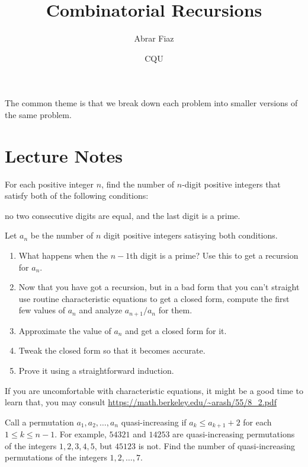 \documentclass[11pt]{article}
\title{Combinatorial Recursions}
\author{Abrar Fiaz}
\date{CQU}
\begin{document}
\maketitle

The common theme is that we break down each problem into smaller versions of the same problem.





\section{Lecture Notes}


\begin{exam}[USAJMO 2018/1]
For each positive integer $n$, find the number of $n$-digit positive integers that satisfy both of the following conditions:
\begin{itemize}
\Item no two consecutive digits are equal, and
\Item the last digit is a prime.
\end{itemize}
\end{exam}

\begin{walk}
Let $a_n$ be the number of $n$ digit positive integers satisying both conditions.

\begin{enumerate}
\item What happens when the $n-1$th digit is a prime? Use this to get a recursion for $a_n.$
\item Now that you have got a recursion, but in a bad form that you can't straight use routine characteristic equations to get a closed form, compute the first few 
values of $a_n$ and analyze $a_{n+1}/a_n$ for them.
\item Approximate the value of $a_n$ and get a closed form for it.
\item Tweak the closed form so that it becomes accurate.
\item Prove it using a straightforward induction. 
\end{enumerate}
\end{walk}

If you are uncomfortable with characteristic equations, it might be a good time to learn that, you may consult  \href{}{\url{https://math.berkeley.edu/~arash/55/8_2.pdf}}


\begin{exam}[AIME 2015 II/10]
Call a permutation $a_1,a_2,\ldots,a_n$ quasi-increasing if $a_k\le a_{k+1}+2$ for each $1\le k\le n-1$. For example, $54321$ and $14253$ are quasi-increasing permutations of the integers $1,2,3,4,5$, but $45123$ is not. Find the number of quasi-increasing permutations of the integers $1,2,\ldots,7$.
\end{exam}
\end{document}
